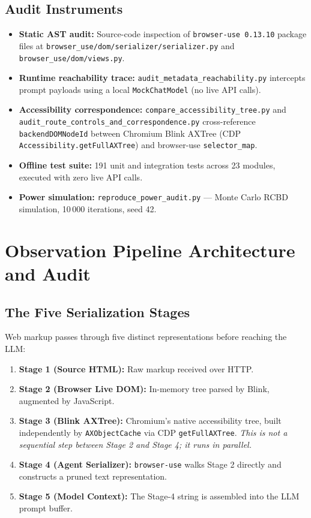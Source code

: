 \documentclass[conference]{IEEEtran}
\begin{document}
\subsection{Audit Instruments}
\begin{itemize}
    \item \textbf{Static AST audit:} Source-code inspection of \texttt{browser-use 0.13.10} package files at \texttt{browser\_use/dom/serializer/serializer.py} and \texttt{browser\_use/dom/views.py}.
    \item \textbf{Runtime reachability trace:} \texttt{audit\_metadata\_reachability.py} intercepts prompt payloads using a local \texttt{MockChatModel} (no live API calls).
    \item \textbf{Accessibility correspondence:} \texttt{compare\_accessibility\_tree.py} and \texttt{audit\_route\_controls\_and\_correspondence.py} cross-reference \texttt{backendDOMNodeId} between Chromium Blink AXTree (CDP \texttt{Accessibility.getFullAXTree}) and browser-use \texttt{selector\_map}.
    \item \textbf{Offline test suite:} 191 unit and integration tests across 23 modules, executed with zero live API calls.
    \item \textbf{Power simulation:} \texttt{reproduce\_power\_audit.py} — Monte Carlo RCBD simulation, 10\,000 iterations, seed 42.
\end{itemize}

\section{Observation Pipeline Architecture and Audit}
\label{sec:architecture}

\subsection{The Five Serialization Stages}

Web markup passes through five distinct representations before reaching the LLM:
\begin{enumerate}
    \item \textbf{Stage 1 (Source HTML):} Raw markup received over HTTP.
    \item \textbf{Stage 2 (Browser Live DOM):} In-memory tree parsed by Blink, augmented by JavaScript.
    \item \textbf{Stage 3 (Blink AXTree):} Chromium's native accessibility tree, built independently by \texttt{AXObjectCache} via CDP \texttt{getFullAXTree}. \emph{This is not a sequential step between Stage 2 and Stage 4; it runs in parallel.}
    \item \textbf{Stage 4 (Agent Serializer):} \texttt{browser-use} walks Stage 2 directly and constructs a pruned text representation.
    \item \textbf{Stage 5 (Model Context):} The Stage-4 string is assembled into the LLM prompt buffer.
\end{enumerate}
\end{document}
